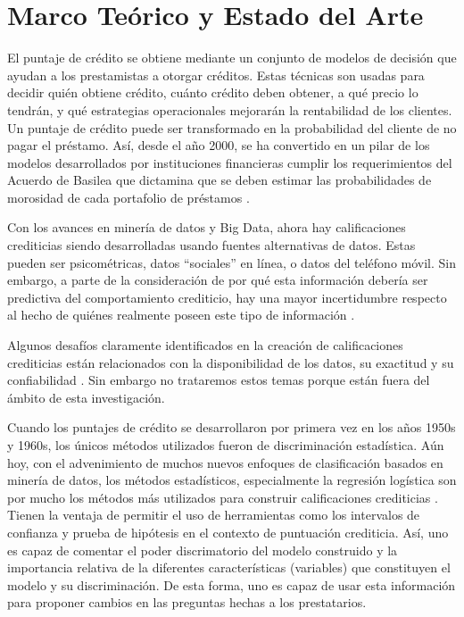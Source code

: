 \chapter{Marco Teórico y Estado del Arte}

El puntaje de crédito se obtiene mediante un conjunto de modelos de decisión que ayudan a los prestamistas a otorgar créditos. Estas técnicas son usadas para decidir quién obtiene crédito, cuánto crédito deben obtener, a qué precio lo tendrán, y qué estrategias operacionales mejorarán la rentabilidad de los clientes. Un puntaje de crédito puede ser transformado en la probabilidad del cliente de no pagar el préstamo. Así, desde el año 2000, se ha convertido en un pilar de los modelos desarrollados por instituciones financieras cumplir los requerimientos del Acuerdo de Basilea que dictamina que se deben estimar las probabilidades de morosidad de cada portafolio de préstamos \cite[1]{thomas2017credit}.

Con los avances en minería de datos y Big Data, ahora hay calificaciones crediticias siendo desarrolladas usando fuentes alternativas de datos. Estas pueden ser psicométricas, datos ``sociales'' en línea, o datos del teléfono móvil. Sin embargo, a parte de la consideración de por qué esta información debería ser predictiva del comportamiento crediticio, hay una mayor incertidumbre respecto al hecho de quiénes realmente poseen este tipo de información \cite[18]{thomas2017credit}.

Algunos desafíos claramente identificados en la creación de calificaciones crediticias están relacionados con la disponibilidad de los datos, su exactitud y su confiabilidad \cite[18--19]{thomas2017credit}. Sin embargo no trataremos estos temas porque están fuera del ámbito de esta investigación.

Cuando los puntajes de crédito se desarrollaron por primera vez en los años 1950s y 1960s, los únicos métodos utilizados fueron de discriminación estadística. Aún hoy, con el advenimiento de muchos nuevos enfoques de clasificación basados en minería de datos, los métodos estadísticos, especialmente la regresión logística son por mucho los métodos más utilizados para construir calificaciones crediticias \cite[25]{thomas2017credit}. Tienen la ventaja de permitir el uso de herramientas como los intervalos de confianza y prueba de hipótesis en el contexto de puntuación crediticia. Así, uno es capaz de comentar el poder discrimatorio del modelo construido y la importancia relativa de la diferentes características (variables) que constituyen el modelo y su discriminación. De esta forma, uno es capaz de usar esta información para proponer cambios en las preguntas hechas a los prestatarios.

